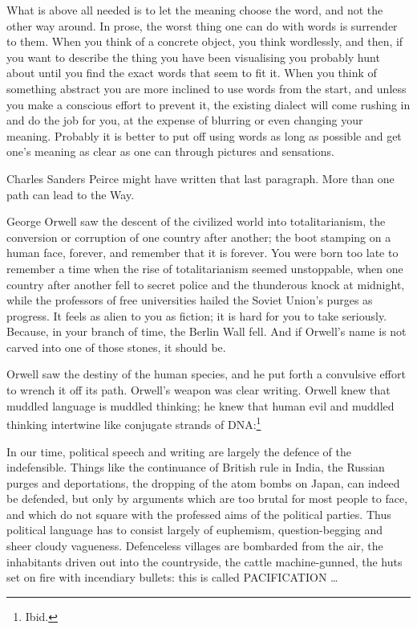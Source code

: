 {
 What is above all needed is to let the meaning choose the word,
and not the other way around. In prose, the worst thing one can do with
words is surrender to them. When you think of a concrete object, you
think wordlessly, and then, if you want to describe the thing you have
been visualising you probably hunt about until you find the exact words
that seem to fit it. When you think of something abstract you are more
inclined to use words from the start, and unless you make a conscious
effort to prevent it, the existing dialect will come rushing in and do
the job for you, at the expense of blurring or even changing your
meaning. Probably it is better to put off using words as long as
possible and get one's meaning as clear as one can
through pictures and sensations.}

{
 Charles Sanders Peirce might have written that last paragraph.
More than one path can lead to the Way.}

\myendsectiontext


\bigskip


{
 George Orwell saw the descent of the civilized world into
totalitarianism, the conversion or corruption of one country after
another; the boot stamping on a human face, forever, and remember that
it is forever. You were born too late to remember a time when the rise
of totalitarianism seemed unstoppable, when one country after another
fell to secret police and the thunderous knock at midnight, while the
professors of free universities hailed the Soviet
Union's purges as progress. It feels as alien to you as
fiction; it is hard for you to take seriously. Because, in your branch
of time, the Berlin Wall fell. And if Orwell's name is
not carved into one of those stones, it should be. }

{
 Orwell saw the destiny of the human species, and he put forth a
convulsive effort to wrench it off its path. Orwell's
weapon was clear writing. Orwell knew that muddled language is muddled
thinking; he knew that human evil and muddled thinking intertwine like
conjugate strands of DNA:\footnote{Ibid.}}

{
 In our time, political speech and writing are largely the defence
of the indefensible. Things like the continuance of British rule in
India, the Russian purges and deportations, the dropping of the atom
bombs on Japan, can indeed be defended, but only by arguments which are
too brutal for most people to face, and which do not square with the
professed aims of the political parties. Thus political language has to
consist largely of euphemism, question-begging and sheer cloudy
vagueness. Defenceless villages are bombarded from the air, the
inhabitants driven out into the countryside, the cattle machine-gunned,
the huts set on fire with incendiary bullets: this is called
PACIFICATION \ldots}

